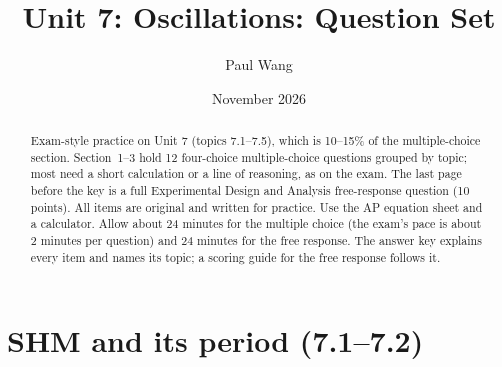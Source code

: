 \documentclass[11pt]{article}
\title{Unit 7: Oscillations: Question Set}
\author{Paul Wang}
\date{November 2026}
\begin{document}
\maketitle

\begin{abstract}
Exam-style practice on Unit 7 (topics 7.1--7.5), which is 10--15\% of the multiple-choice section. Section~1--3 hold 12 four-choice multiple-choice questions grouped by topic; most need a short calculation or a line of reasoning, as on the exam. The last page before the key is a full Experimental Design and Analysis free-response question (10 points). All items are original and written for practice. Use the AP equation sheet and a calculator. Allow about 24 minutes for the multiple choice (the exam's pace is about 2 minutes per question) and 24 minutes for the free response. The answer key explains every item and names its topic; a scoring guide for the free response follows it.
\end{abstract}


\section{SHM and its period (7.1--7.2)}
\end{document}
